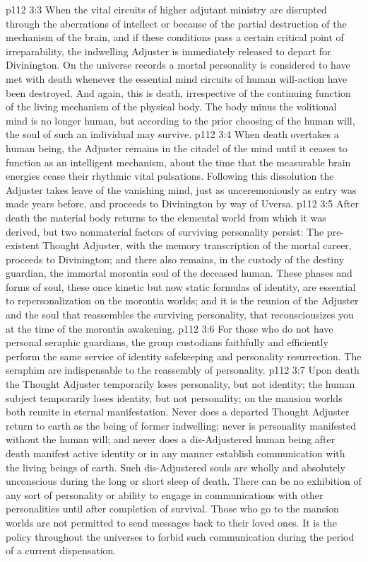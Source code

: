 \vs p112 3:3 \bibnobreakspace {} When the vital circuits of higher adjutant ministry are disrupted through the aberrations of intellect or because of the partial destruction of the mechanism of the brain, and if these conditions pass a certain critical point of irreparability, the indwelling Adjuster is immediately released to depart for Divinington. On the universe records a mortal personality is considered to have met with death whenever the essential mind circuits of human will\hyp{}action have been destroyed. And again, this is death, irrespective of the continuing function of the living mechanism of the physical body. The body minus the volitional mind is no longer human, but according to the prior choosing of the human will, the soul of such an individual may survive.
\vs p112 3:4 \bibnobreakspace {} When death overtakes a human being, the Adjuster remains in the citadel of the mind until it ceases to function as an intelligent mechanism, about the time that the measurable brain energies cease their rhythmic vital pulsations. Following this dissolution the Adjuster takes leave of the vanishing mind, just as unceremoniously as entry was made years before, and proceeds to Divinington by way of Uversa.
\vs p112 3:5 \pc After death the material body returns to the elemental world from which it was derived, but two nonmaterial factors of surviving personality persist: The pre\hyp{}existent Thought Adjuster, with the memory transcription of the mortal career, proceeds to Divinington; and there also remains, in the custody of the destiny guardian, the immortal morontia soul of the deceased human. These phases and forms of soul, these once kinetic but now static formulas of identity, are essential to repersonalization on the morontia worlds; and it is the reunion of the Adjuster and the soul that reassembles the surviving personality, that reconsciousizes you at the time of the morontia awakening.
\vs p112 3:6 For those who do not have personal seraphic guardians, the group custodians faithfully and efficiently perform the same service of identity safekeeping and personality resurrection. The seraphim are indispensable to the reassembly of personality.
\vs p112 3:7 Upon death the Thought Adjuster temporarily loses personality, but not identity; the human subject temporarily loses identity, but not personality; on the mansion worlds both reunite in eternal manifestation. Never does a departed Thought Adjuster return to earth as the being of former indwelling; never is personality manifested without the human will; and never does a dis\hyp{}Adjustered human being after death manifest active identity or in any manner establish communication with the living beings of earth. Such dis\hyp{}Adjustered souls are wholly and absolutely unconscious during the long or short sleep of death. There can be no exhibition of any sort of personality or ability to engage in communications with other personalities until after completion of survival. Those who go to the mansion worlds are not permitted to send messages back to their loved ones. It is the policy throughout the universes to forbid such communication during the period of a current dispensation.
